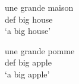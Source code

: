 
\gll une grande maison\\
     def big house\\
\glt `a big house'


\gll une grande pomme\\
     def big apple\\
\glt `a big apple'

